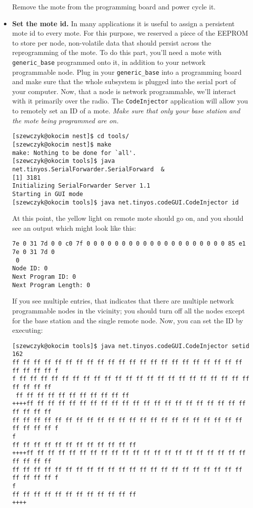 \documentclass[12pt,fullpage]{article}
\newcommand{\application}[1]{{\tt #1}}
\begin{document}
\begin{itemize}
Remove the mote from the programming board and power cycle it.

\item{\bf Set the mote id.} In many applications it is useful to assign a
persistent mote id to every mote. For this purpose, we reserved a piece of the
EEPROM to store per node, non-volatile data that should persist across the
reprogramming of the mote.  To do this part, you'll need a
mote with \application{generic\_base} programmed onto it, in addition to your
network programmable node. Plug in your
\application{generic\_base} into a programming board and make sure that the
whole subsystem is plugged into the serial port of your computer.  Now, that a
node is network programmable, we'll interact with it primarily over the
radio.  The {\tt CodeInjector} application will allow you to remotely set an
ID of a mote.  {\em Make sure that only your base station and the mote  being
programmed are on.} 

\begin{small}
\begin{verbatim}
[szewczyk@okocim nest]$ cd tools/
[szewczyk@okocim nest]$ make
make: Nothing to be done for `all'.
[szewczyk@okocim tools]$ java net.tinyos.SerialForwarder.SerialForward  &
[1] 3181
Initializing SerialForwarder Server 1.1
Starting in GUI mode
[szewczyk@okocim tools]$ java net.tinyos.codeGUI.CodeInjector id
\end{verbatim}
\end{small}

At this point, the yellow light on remote mote should go on, and you should
see an output which might look like this:
\begin{small}
\begin{verbatim}
7e 0 31 7d 0 0 c0 7f 0 0 0 0 0 0 0 0 0 0 0 0 0 0 0 0 0 0 0 0 85 e1 7e 0 31 7d 0
 0
Node ID: 0
Next Program ID: 0
Next Program Length: 0
\end{verbatim}
\end{small}

If you see multiple entries, that indicates that there are multiple network
programmable nodes in the vicinity; you should turn off all the nodes except
for the base station and the single remote node. Now, you can set the ID by
executing: 
\begin{small}
\begin{verbatim}
[szewczyk@okocim tools]$ java net.tinyos.codeGUI.CodeInjector setid 162
ff ff ff ff ff ff ff ff ff ff ff ff ff ff ff ff ff ff ff ff ff ff ff ff ff ff f
f ff ff ff ff ff ff ff ff ff ff ff ff ff ff ff ff ff ff ff ff ff ff ff ff ff ff
 ff ff ff ff ff ff ff ff ff ff ff
++++ff ff ff ff ff ff ff ff ff ff ff ff ff ff ff ff ff ff ff ff ff ff ff ff ff
ff ff ff ff ff ff ff ff ff ff ff ff ff ff ff ff ff ff ff ff ff ff ff ff ff ff f
f
ff ff ff ff ff ff ff ff ff ff ff ff
++++ff ff ff ff ff ff ff ff ff ff ff ff ff ff ff ff ff ff ff ff ff ff ff ff ff
ff ff ff ff ff ff ff ff ff ff ff ff ff ff ff ff ff ff ff ff ff ff ff ff ff ff f
f
ff ff ff ff ff ff ff ff ff ff ff ff
++++
\end{verbatim}
\end{small} 


\end{itemize}
\end{document}
